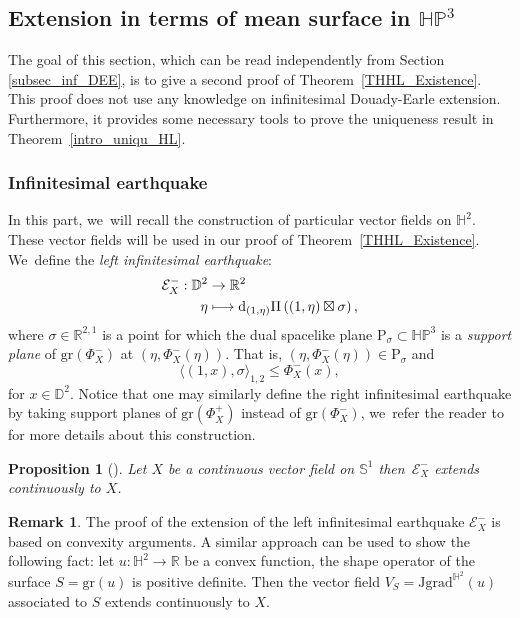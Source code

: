 \documentclass[10pt]{amsart}
\newcommand\mto{\mathchoice{\longmapsto}{\mapsto}{\mapsto}{\mapsto}}
\theoremstyle{plain}
\newtheorem{prop}[cor]{Proposition}
\theoremstyle{definition}
\newtheorem{remark}[cor]{Remark}
\newcommand{\HP}{\mathbb{HP}^3}
\newcommand{\grad}{\mathrm{grad}^{\mathbb{H}^2}}
\newcommand{\J}{\mathrm{J}}
\newcommand{\inner}[1] {\langle #1 \rangle}
\begin{document}
\subsection{Extension in terms of mean surface in \texorpdfstring{$\HP$}{HP}}\label{section_5.2_extension_mean_surface}
The goal of this section, which can be read independently from Section \ref{subsec_inf_DEE}, is to give a second proof of Theorem~\ref{THHL_Existence}. This proof does not use any knowledge on infinitesimal Douady-Earle extension. Furthermore, it provides some necessary tools to prove the uniqueness result in Theorem~\ref{intro_uniqu_HL}.

\subsubsection{Infinitesimal earthquake}\label{appendix6.1}
In this part, we~will recall the construction of particular vector fields on $\mathbb{H}^2$. These vector fields will be used in our proof of Theorem~\ref{THHL_Existence}. We~define the \emph{left infinitesimal earthquake}:
\begin{equation}\label{infearth_convexhull}
\begin{aligned}
\mathcal{E}_{X}^-: \mathbb{D}^2 & \to \mathbb{R}^2 \\
\eta & \mto \mathrm{d}_{(1,\eta)}\Pi\left((1,\eta)\boxtimes \sigma\right),
\end{aligned}
\end{equation}
where $\sigma \in \mathbb{R}^{2,1}$ is a point for which the dual spacelike plane $\mathrm{P}_{\sigma}\subset\HP$ is a \emph{support plane} of $\mathrm{gr}(\Phi_X^-)$ at $(\eta, \Phi_X^-(\eta))$. That is, $(\eta, \Phi_X^-(\eta)) \in \mathrm{P}_{\sigma}$ and
\[
\inner{(1,x),\sigma}_{1,2}\leq\Phi_X^-(x),
\]
for $x\in\mathbb{D}^2$. Notice that one may similarly define the right infinitesimal earthquake by taking support planes of $\mathrm{gr}(\Phi_X^+)$ instead of $\mathrm{gr}(\Phi_X^-)$, we~refer the reader to \cite{diaf2023Infearth} for more details about this construction.

\begin{prop}[{\cite[Prop.\,4.6]{diaf2023Infearth}}]\label{infinitesimal_earthquake_thm}
Let $X$ be a continuous vector field on $\mathbb{S}^1$ then~$\mathcal{E}_X^{-}$ extends continuously to $X$.
\end{prop}

\begin{remark}
The proof of the extension of the left infinitesimal earthquake $\mathcal{E}_X^-$ is based on convexity arguments. A similar approach can be used to show the following fact: let $u:\mathbb{H}^2\to\mathbb{R}$ be a convex function, \ie the shape operator of the surface $S=\mathrm{gr}(u)$ is positive definite. Then the vector field $V_S=\J\grad(u)$ associated to $S$ extends continuously to $X$.
\end{remark}
\end{document}
